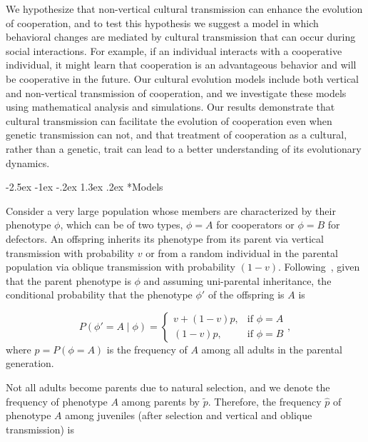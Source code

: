 \documentclass[12pt]{extarticle}
\makeatletter
\renewcommand\section{\@startsection {section}{1}{\z@}%
     {-2.5ex \@plus -1ex \@minus -.2ex}%
     {1.3ex \@plus.2ex}%
    {\Large\bfseries}}
\makeatother
\begin{document}
We hypothesize that non-vertical cultural transmission can enhance the evolution of cooperation, and 
to test this hypothesis we suggest a model in which behavioral changes are mediated by cultural transmission that can occur during social interactions. For example, if an individual interacts with a cooperative individual, it might learn that cooperation is an advantageous behavior and will be cooperative in the future. 
Our cultural evolution models  include both vertical and non-vertical transmission of cooperation, and we investigate these models using mathematical analysis and simulations.  
Our results demonstrate that cultural transmission can facilitate the evolution of cooperation even when genetic transmission can not, and that treatment of cooperation as a cultural, rather than a genetic, trait can lead to a better understanding of its evolutionary dynamics.


\section*{Models}

Consider a very large population whose members are characterized by their phenotype $\phi$, which can be of two types, $\phi=A$ for cooperators or $\phi=B$ for defectors.
An offspring inherits its phenotype from its parent via vertical transmission with probability $v$ or from a random individual in the parental population via oblique transmission with probability $(1-v)$. 
Following~\citet{ram2018evolution}, given that the parent phenotype is $\phi$ and assuming uni-parental inheritance, %
the conditional probability that the phenotype $\phi'$ of the offspring is $A$ is 

\begin{equation} \label{eq:vertical_oblique_transmission}
P(\phi'=A \mid \phi) = \begin{cases}
v + (1-v)p, & \text{if } \phi=A \\
(1-v)p, & \text{if } \phi=B
\end{cases},
\end{equation}
where $p=P(\phi=A)$ is the frequency of $A$ among all adults in the parental generation.  

Not all adults become parents due to natural selection, and we denote the frequency of phenotype $A$ among parents by $\tilde{p}$.
Therefore, the frequency $\hat{p}$ of  phenotype $A$ among juveniles (after selection and vertical and oblique transmission) is
\end{document}
